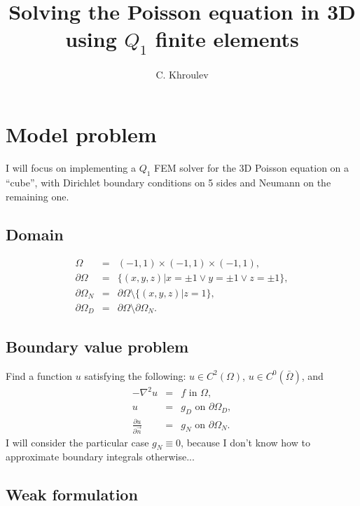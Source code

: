 \documentclass{article}
\begin{document}
\title{Solving the Poisson equation in 3D using $Q_{1}$ finite elements}
\author{C. Khroulev}
\maketitle

{\tableofcontents}

\section{Model problem}

I will focus on implementing a $Q_1$ FEM solver for the 3D Poisson equation on
a ``cube'', with Dirichlet boundary conditions on 5 sides and Neumann on the
remaining one.

\subsection{Domain}

\begin{eqnarray*}
  \Omega & = & (- 1, 1) \times (- 1, 1) \times (- 1, 1),\\
  \partial \Omega & = & \{ (x, y, z) | x = \pm 1 \vee y = \pm 1 \vee z = \pm
  1 \},\\
  \partial \Omega_N & = & \partial \Omega \setminus \{ (x, y, z) |z = 1 \},\\
  \partial \Omega_D & = & \partial \Omega \setminus \partial \Omega_N .
\end{eqnarray*}

\subsection{Boundary value problem}

Find a function $u$ satisfying the following: $u \in C^2 (\Omega)$, $u \in
C^0 (\bar{\Omega})$, and
\begin{eqnarray}
  - \nabla^2 u & = & f \text{ in } \Omega,  \label{eq:poisson}\\
  u & = & g_D  \text{ on } \partial \Omega_D, \nonumber\\
  \frac{\partial u}{\partial \vec{n}} & = & g_N  \text{ on } \partial \Omega_N
  . \nonumber
\end{eqnarray}
I will consider the particular case $g_N \equiv 0$, because I don't know how
to approximate boundary integrals otherwise...

\subsection{Weak formulation}
\end{document}
